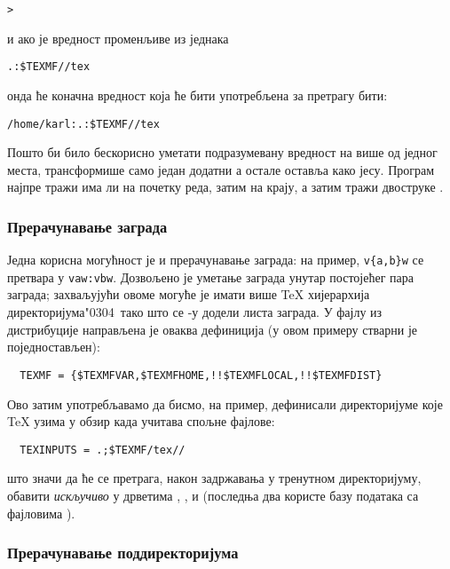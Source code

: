 \documentclass{article}
\begin{document}
\begin{alltt}> 
\end{alltt}
и ако је вредност променљиве  из 
једнака

\begin{alltt}  .:\$TEXMF//tex
\end{alltt}
онда ће коначна вредност која ће бити употребљена за претрагу бити:

\begin{alltt}  /home/karl:.:\$TEXMF//tex
\end{alltt}

Пошто би било бескорисно уметати подразумевану вредност на више од
једног места, \KPS{} трансформише само један додатни \samp{:} а
остале оставља како јесу. Програм најпре тражи има ли \samp{:} на
почетку реда, затим на крају, а затим тражи двоструке \samp{:}.

\subsubsection{Прерачунавање заграда}
\label{sec:brace-expansion}

Једна корисна могућност је и прерачунавање заграда: на пример,
\verb+v{a,b}w+ се претвара у  \verb+vaw:vbw+. Дозвољено је уметање
заграда унутар постојећег пара заграда; захваљујући овоме могуће је
имати више \TeX{} хијерархија директоријума\char"0304\ тако што се
-у додели листа заграда. У фајлу  
из дистрибуције направљена је оваква дефиниција (у овом примеру
стварни  је поједностављен):
\begin{verbatim}
  TEXMF = {$TEXMFVAR,$TEXMFHOME,!!$TEXMFLOCAL,!!$TEXMFDIST}
\end{verbatim}
Ово затим употребљавамо да бисмо, на пример, дефинисали директоријуме које
\TeX{} узима у обзир када учитава спољне фајлове:
\begin{verbatim}
  TEXINPUTS = .;$TEXMF/tex//
\end{verbatim}
што значи да ће се претрага, након задржавања у тренутном
директоријуму, обавити \emph{искључиво} у дрветима
, ,
 и  (последња два користе
базу података са фајловима ). 

\subsubsection{Прерачунавање поддиректоријума}
\label{sec:subdirectory-expansion}
\end{document}
